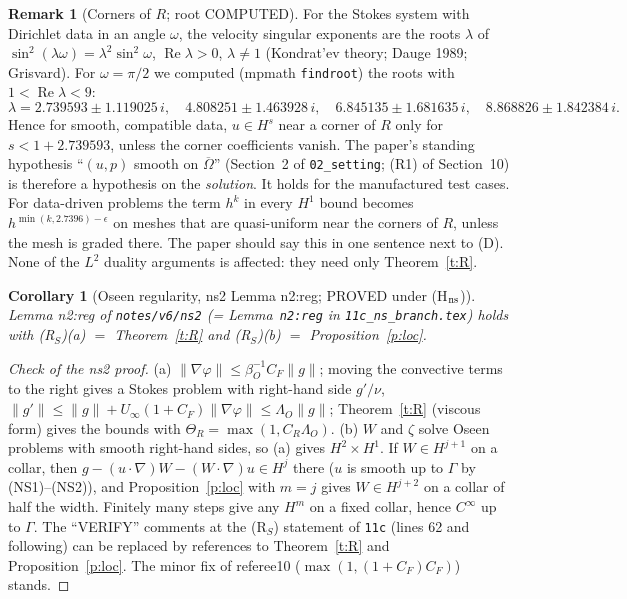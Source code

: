 \documentclass[11pt,reqno]{amsart}
\theoremstyle{plain}
\newtheorem{corollary}[theorem]{Corollary}
\theoremstyle{definition}
\newtheorem{remark}[theorem]{Remark}
\newcommand{\norm}[1]{\lVert #1\rVert}
\begin{document}
\begin{remark}[Corners of $R$; root COMPUTED]\label{r:corner}
For the Stokes system with Dirichlet data in an angle $\omega$, the velocity singular exponents are the roots $\lambda$ of $\sin^2(\lambda\omega)=\lambda^2\sin^2\omega$, $\operatorname{Re}\lambda>0$, $\lambda\ne1$ (Kondrat'ev theory; Dauge 1989; Grisvard). For $\omega=\pi/2$ we computed (mpmath \texttt{findroot}) the roots with $1<\operatorname{Re}\lambda<9$:
\[
\lambda=2.739593\pm1.119025\,i,\quad 4.808251\pm1.463928\,i,\quad 6.845135\pm1.681635\,i,\quad 8.868826\pm1.842384\,i .
\]
Hence for smooth, compatible data, $u\in H^s$ near a corner of $R$ only for $s<1+2.739593$, unless the corner coefficients vanish. The paper's standing hypothesis ``$(u,p)$ smooth on $\overline\Omega$'' (Section~2 of \texttt{02\_setting}; (R1) of Section~10) is therefore a hypothesis on the \emph{solution}. It holds for the manufactured test cases. For data-driven problems the term $h^k$ in every $H^1$ bound becomes $h^{\min(k,2.7396)-\epsilon}$ on meshes that are quasi-uniform near the corners of $R$, unless the mesh is graded there. The paper should say this in one sentence next to (D). None of the $L^2$ duality arguments is affected: they need only Theorem~\ref{t:R}.
\end{remark}

\begin{corollary}[Oseen regularity, ns2 Lemma n2:reg; PROVED under (H$_{\rm ns}$)]\label{c:oseen}
Lemma n2:reg of \texttt{notes/v6/ns2} (= Lemma~\texttt{n2:reg} in \texttt{11c\_ns\_branch.tex}) holds with (R$_S$)(a) $=$ Theorem~\ref{t:R} and (R$_S$)(b) $=$ Proposition~\ref{p:loc}.
\end{corollary}

\begin{proof}[Check of the ns2 proof]
(a) $\norm{\nabla\varphi}\le\beta_O^{-1}C_F\norm g$; moving the convective terms to the right gives a Stokes problem with right-hand side $g'/\nu$, $\norm{g'}\le\norm g+U_\infty(1+C_F)\norm{\nabla\varphi}\le\Lambda_O\norm g$; Theorem~\ref{t:R} (viscous form) gives the bounds with $\Theta_R=\max(1,C_R\Lambda_O)$. (b) $W$ and $\zeta$ solve Oseen problems with smooth right-hand sides, so (a) gives $H^2\times H^1$. If $W\in H^{j+1}$ on a collar, then $g-(u\cdot\nabla)W-(W\cdot\nabla)u\in H^j$ there ($u$ is smooth up to $\Gamma$ by (NS1)--(NS2)), and Proposition~\ref{p:loc} with $m=j$ gives $W\in H^{j+2}$ on a collar of half the width. Finitely many steps give any $H^m$ on a fixed collar, hence $C^\infty$ up to $\Gamma$. The ``VERIFY'' comments at the (R$_S$) statement of \texttt{11c} (lines 62 and following) can be replaced by references to Theorem~\ref{t:R} and Proposition~\ref{p:loc}. The minor fix of referee10 ($\max(1,(1+C_F)C_F)$) stands.
\end{proof}
\end{document}

